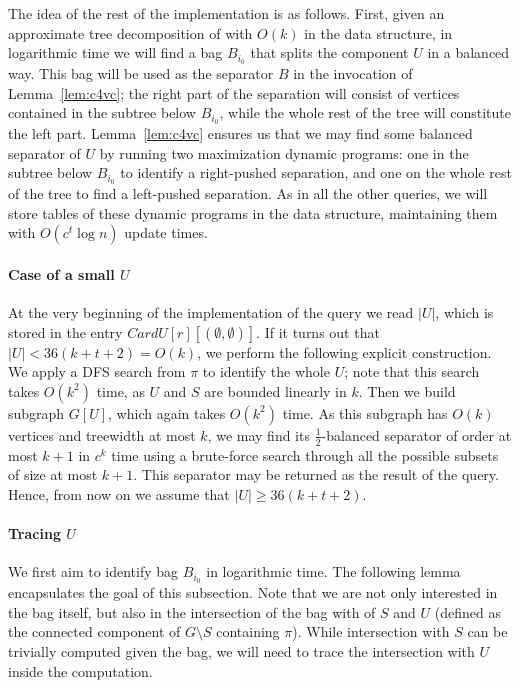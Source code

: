 \documentclass[a4paper,11pt]{article}
\theoremstyle{definition}
\theoremstyle{remark}
\newcommand{\pin}{\pi}
\begin{document}
The idea of the rest of the implementation is as follows.  First,
given an approximate tree decomposition of with $O(k)$ in the data
structure, in logarithmic time we will find a bag $B_{i_0}$ that
splits the component $U$ in a balanced way.  This bag will be used as
the separator $B$ in the invocation of Lemma~\ref{lem:c4vc}; the right
part of the separation will consist of vertices contained in the
subtree below $B_{i_0}$, while the whole rest of the tree will
constitute the left part.  Lemma~\ref{lem:c4vc} ensures us that we may
find some balanced separator of $U$ by running two maximization
dynamic programs: one in the subtree below $B_{i_0}$ to identify a
right-pushed separation, and one on the whole rest of the tree to find
a left-pushed separation.  As in all the other queries, we will store
tables of these dynamic programs in the data structure, maintaining them
with $O(c^t \log n)$ update times.

\paragraph{Case of a small $U$}
At the very beginning of the implementation of the query we read
$|U|$, which is stored in the entry $CardU[r][(\emptyset,\emptyset)]$.
If it turns out that $|U|< 36(k+t+2)=O(k)$, we perform the following
explicit construction.  We apply a DFS search from $\pin$ to identify
the whole $U$; note that this search takes $O(k^2)$ time, as $U$ and
$S$ are bounded linearly in $k$.  Then we build subgraph $G[U]$, which
again takes $O(k^2)$ time.  As this subgraph has $O(k)$ vertices and
treewidth at most $k$, we may find its $\frac{1}{2}$-balanced
separator of order at most $k+1$ in $c^k$ time using a brute-force
search through all the possible subsets of size at most $k+1$.  This
separator may be returned as the result of the query.  Hence, from now
on we assume that $|U|\geq 36(k+t+2)$.

\paragraph{Tracing $U$}
We first aim to identify bag $B_{i_0}$ in logarithmic time.  The
following lemma encapsulates the goal of this subsection.  Note that
we are not only interested in the bag itself, but also in the
intersection of the bag with of $S$ and $U$ (defined as the connected
component of $G\setminus S$ containing $\pin$).  While intersection
with $S$ can be trivially computed given the bag, we will need to
trace the intersection with $U$ inside the computation.
\end{document}
